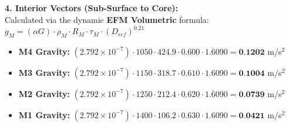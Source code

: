 \documentclass[11pt, a4paper]{article}
\begin{document}
  \vspace{0.5em}
  \noindent \textbf{4. Interior Vectors (Sub-Surface to Core):} \\[0.5em]
  \hspace*{1em} Calculated via the dynamic \textbf{EFM Volumetric} formula: $g_M = (\alpha G) \cdot \rho_{M} \cdot R_M \cdot \tau_M \cdot (D_{ref})^{0.21}$
  \begin{itemize}
    \item \textbf{M4 Gravity:} $(2.792 \times 10^{-7}) \cdot 1050 \cdot 424.9 \cdot 0.600 \cdot 1.6090 = \textbf{0.1202}$ m/s$^2$
    \item \textbf{M3 Gravity:} $(2.792 \times 10^{-7}) \cdot 1150 \cdot 318.7 \cdot 0.610 \cdot 1.6090 = \textbf{0.1004}$ m/s$^2$
    \item \textbf{M2 Gravity:} $(2.792 \times 10^{-7}) \cdot 1250 \cdot 212.4 \cdot 0.620 \cdot 1.6090 = \textbf{0.0739}$ m/s$^2$
    \item \textbf{M1 Gravity:} $(2.792 \times 10^{-7}) \cdot 1400 \cdot 106.2 \cdot 0.630 \cdot 1.6090 = \textbf{0.0421}$ m/s$^2$
  \end{itemize}
\end{document}
